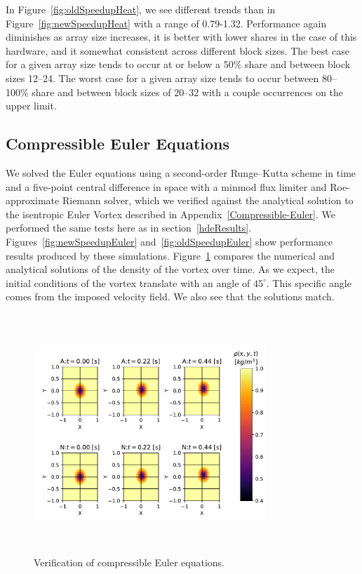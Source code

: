 \documentclass[preprints,article,accept,moreauthors,pdftex]{Definitions/mdpi}
\begin{document}
In Figure~\ref{fig:oldSpeedupHeat}, we see different trends than in Figure~\ref{fig:newSpeedupHeat} with a range of 0.79-1.32. 
Performance again diminishes as array size increases, it is better with lower shares in the case of this hardware, and it somewhat consistent across different block sizes. The best case for a given array size tends to occur at or below a 50\% share and between block sizes 12--24. 
The worst case for a given array size tends to occur between 80--100\% share and between block sizes of 20--32 with a couple occurrences on the upper limit.

\subsection{Compressible Euler Equations}
\label{eulerVortexResults}

We solved the Euler equations using a second-order Runge--Kutta scheme in time and a five-point central difference in space with a minmod flux limiter and Roe-approximate Riemann solver, which we verified against the analytical solution to the isentropic Euler Vortex described in Appendix~\ref{Compressible-Euler}. 
We performed the same tests here as in section~\ref{hdeResults}. Figures~\ref{fig:newSpeedupEuler} and~\ref{fig:oldSpeedupEuler} show performance results produced by these simulations. Figure~\ref{fig:eulerSurface} compares the numerical and analytical solutions of the density of the vortex over time. As we expect, the initial conditions of the vortex translate with an angle of $45^\circ$. This specific angle comes from the imposed velocity field. We also see that the solutions match.

\begin{figure}[htbp]
    \centering
    \includegraphics[height=9cm,width=0.78\textwidth, trim={0.75cm 0.3cm 0.2cm 0.2cm},clip]{figs/eulerValidate.pdf}
    \caption{Verification of compressible Euler equations.}
    \label{fig:eulerSurface}
\end{figure}
\end{document}
